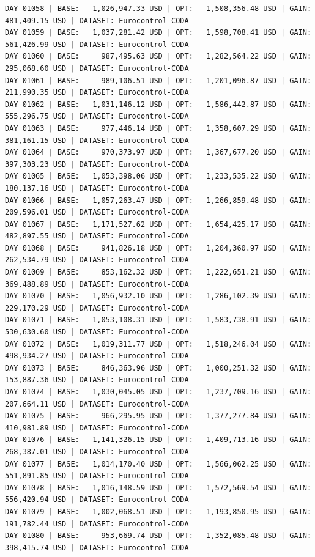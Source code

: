 \documentclass[11pt,a4paper]{article}
\begin{document}
\begin{verbatim}
DAY 01058 | BASE:   1,026,947.33 USD | OPT:   1,508,356.48 USD | GAIN: 481,409.15 USD | DATASET: Eurocontrol-CODA
DAY 01059 | BASE:   1,037,281.42 USD | OPT:   1,598,708.41 USD | GAIN: 561,426.99 USD | DATASET: Eurocontrol-CODA
DAY 01060 | BASE:     987,495.63 USD | OPT:   1,282,564.22 USD | GAIN: 295,068.60 USD | DATASET: Eurocontrol-CODA
DAY 01061 | BASE:     989,106.51 USD | OPT:   1,201,096.87 USD | GAIN: 211,990.35 USD | DATASET: Eurocontrol-CODA
DAY 01062 | BASE:   1,031,146.12 USD | OPT:   1,586,442.87 USD | GAIN: 555,296.75 USD | DATASET: Eurocontrol-CODA
DAY 01063 | BASE:     977,446.14 USD | OPT:   1,358,607.29 USD | GAIN: 381,161.15 USD | DATASET: Eurocontrol-CODA
DAY 01064 | BASE:     970,373.97 USD | OPT:   1,367,677.20 USD | GAIN: 397,303.23 USD | DATASET: Eurocontrol-CODA
DAY 01065 | BASE:   1,053,398.06 USD | OPT:   1,233,535.22 USD | GAIN: 180,137.16 USD | DATASET: Eurocontrol-CODA
DAY 01066 | BASE:   1,057,263.47 USD | OPT:   1,266,859.48 USD | GAIN: 209,596.01 USD | DATASET: Eurocontrol-CODA
DAY 01067 | BASE:   1,171,527.62 USD | OPT:   1,654,425.17 USD | GAIN: 482,897.55 USD | DATASET: Eurocontrol-CODA
DAY 01068 | BASE:     941,826.18 USD | OPT:   1,204,360.97 USD | GAIN: 262,534.79 USD | DATASET: Eurocontrol-CODA
DAY 01069 | BASE:     853,162.32 USD | OPT:   1,222,651.21 USD | GAIN: 369,488.89 USD | DATASET: Eurocontrol-CODA
DAY 01070 | BASE:   1,056,932.10 USD | OPT:   1,286,102.39 USD | GAIN: 229,170.29 USD | DATASET: Eurocontrol-CODA
DAY 01071 | BASE:   1,053,108.31 USD | OPT:   1,583,738.91 USD | GAIN: 530,630.60 USD | DATASET: Eurocontrol-CODA
DAY 01072 | BASE:   1,019,311.77 USD | OPT:   1,518,246.04 USD | GAIN: 498,934.27 USD | DATASET: Eurocontrol-CODA
DAY 01073 | BASE:     846,363.96 USD | OPT:   1,000,251.32 USD | GAIN: 153,887.36 USD | DATASET: Eurocontrol-CODA
DAY 01074 | BASE:   1,030,045.05 USD | OPT:   1,237,709.16 USD | GAIN: 207,664.11 USD | DATASET: Eurocontrol-CODA
DAY 01075 | BASE:     966,295.95 USD | OPT:   1,377,277.84 USD | GAIN: 410,981.89 USD | DATASET: Eurocontrol-CODA
DAY 01076 | BASE:   1,141,326.15 USD | OPT:   1,409,713.16 USD | GAIN: 268,387.01 USD | DATASET: Eurocontrol-CODA
DAY 01077 | BASE:   1,014,170.40 USD | OPT:   1,566,062.25 USD | GAIN: 551,891.85 USD | DATASET: Eurocontrol-CODA
DAY 01078 | BASE:   1,016,148.59 USD | OPT:   1,572,569.54 USD | GAIN: 556,420.94 USD | DATASET: Eurocontrol-CODA
DAY 01079 | BASE:   1,002,068.51 USD | OPT:   1,193,850.95 USD | GAIN: 191,782.44 USD | DATASET: Eurocontrol-CODA
DAY 01080 | BASE:     953,669.74 USD | OPT:   1,352,085.48 USD | GAIN: 398,415.74 USD | DATASET: Eurocontrol-CODA

\end{verbatim}
\end{document}
